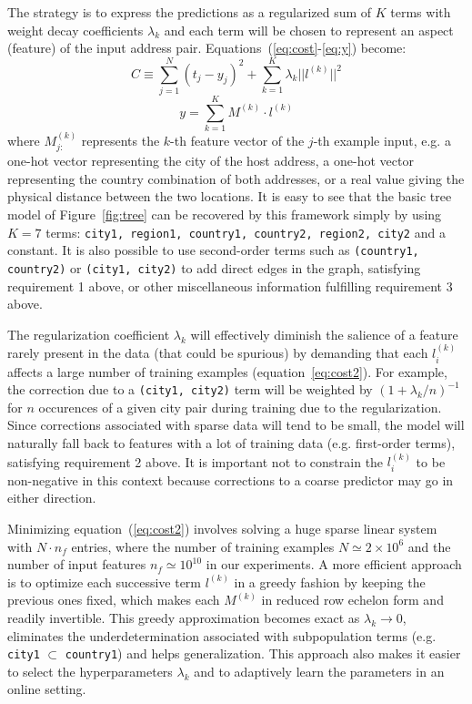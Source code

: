 \documentclass[10pt,a4paper,notitlepage,twocolumn]{article}
\begin{document}
The strategy is to express the predictions as a regularized sum of $K$ terms with weight decay coefficients $\lambda_k$ and each term will be chosen to represent an aspect (feature) of the input address pair.
Equations~(\ref{eq:cost}-\ref{eq:y}) become:
\begin{equation} \label{eq:cost2}
C \equiv \sum_{j=1}^N(t_j-y_j)^2 + \sum_{k=1}^K \lambda_k ||l^{(k)}||^2
\end{equation}
\begin{equation} \label{eq:y2}
y = \sum_{k=1}^K M^{(k)}\cdot l^{(k)}
\end{equation}
where $M_{j:}^{(k)}$ represents the $k$-th feature vector of the $j$-th example input, e.g. a one-hot vector representing the city of the host address, a one-hot vector representing the country combination of both addresses, or a real value giving the physical distance between the two locations.
It is easy to see that the basic tree model of Figure~\ref{fig:tree} can be recovered by this framework simply by using $K=7$ terms: \texttt{city1, region1, country1, country2, region2, city2} and a constant.
%
It is also possible to use second-order terms such as \texttt{(country1, country2)} or \texttt{(city1, city2)} to add direct edges in the graph, satisfying requirement 1 above, or other miscellaneous information fulfilling requirement 3 above.

The regularization coefficient $\lambda_k$ will effectively diminish the salience of a feature rarely present in the data (that could be spurious) by demanding that each $l_i^{(k)}$ affects a large number of training examples (equation~\ref{eq:cost2}).
For example, the correction due to a \texttt{(city1, city2)} term will be weighted by $(1+\lambda_k/n)^{-1}$ for $n$ occurences of a given city pair during training due to the regularization.
Since corrections associated with sparse data will tend to be small, the model will naturally fall back to features with a lot of training data (e.g. first-order terms), satisfying requirement 2 above.
It is important not to constrain the $l^{(k)}_i$ to be non-negative in this context because corrections to a coarse predictor may go in either direction.

Minimizing equation~(\ref{eq:cost2}) involves solving a huge sparse linear system with $N\cdot n_f$ entries, where the number of training examples $N\simeq 2\times 10^6$ and the number of input features $n_f\simeq10^{10}$ in our experiments.
A more efficient approach is to optimize each successive term $l^{(k)}$ in a greedy fashion by keeping the previous ones fixed, which makes each $M^{(k)}$ in reduced row echelon form and readily invertible.
This greedy approximation becomes exact as $\lambda_k\rightarrow 0$, eliminates the underdetermination associated with subpopulation terms (e.g. \texttt{city1} $\subset$ \texttt{country1}) and helps generalization.
 This approach also makes it easier to select the hyperparameters $\lambda_k$ and to adaptively learn the parameters in an online setting.
\end{document}
